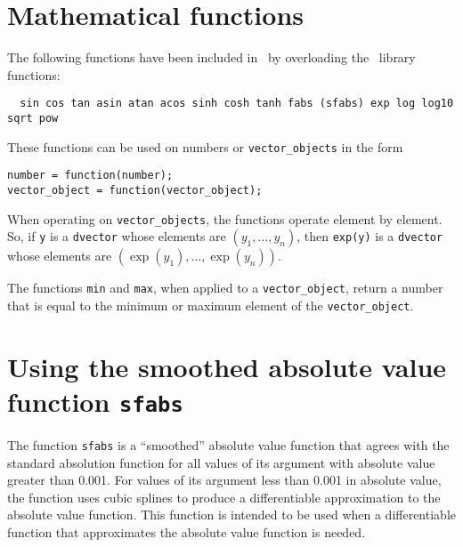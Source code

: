 \documentclass{admbmanual}
\begin{document}
\section{Mathematical functions}

 The following functions have been included in \scAD\ by overloading the 
\cplus\ library functions:
\begin{lstlisting}
  sin cos tan asin atan acos sinh cosh tanh fabs (sfabs) exp log log10 sqrt pow 
\end{lstlisting}
These functions can be used on numbers or \texttt{vector\_objects}
in the form 
\begin{lstlisting}
number = function(number);
vector_object = function(vector_object);
\end{lstlisting}
When operating on \texttt{vector\_objects}, the functions operate  
element by element.  So, if \texttt{y} is a \texttt{dvector} whose
elements are $(y_1,\ldots,y_n)$, then \texttt{exp(y)} is a 
\texttt{dvector} whose elements are $(\exp(y_1),\ldots,\exp(y_n))$.

The functions \texttt{min} and \texttt{max}, when applied to a \texttt{vector\_object},
return a number that is equal to the minimum or maximum element of the
\texttt{vector\_object}.


\section{Using the smoothed absolute value function \texttt{sfabs}}

The function \texttt{sfabs} is a ``smoothed'' absolute value function
that agrees with the standard absolution function for all values
of its argument with absolute value greater than 0.001. For values
of its argument less than 0.001 in absolute value, the function
uses cubic splines to produce a differentiable approximation to the
absolute value function. This function is intended to be used
when a differentiable function that approximates the absolute value
function is needed.
\end{document}

